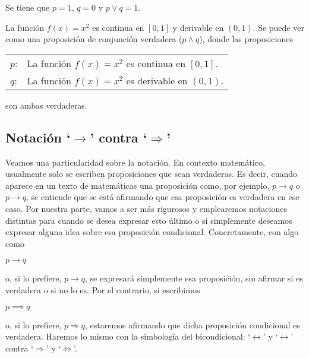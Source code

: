 \noindent Se tiene que $p = 1$, $q = 0$ y $p \lor q = 1$.

La función $f(x) = x^2$ es continua en $[0,1]$ y derivable en $(0,1)$. Se
puede ver como una proposición de conjunción verdadera ($p \land q$), donde
las proposiciones

\begin{center}
\begin{tabular}{ll}
  $p$: & La función $f(x) = x^2$ es continua en $[0,1]$. \\
  $q$: & La función $f(x) = x^2$ es derivable en $(0,1)$.
\end{tabular}
\end{center}

\noindent son ambas verdaderas.






\subsection{Notación `$\rightarrow$' contra `$\Rightarrow$'}%
\label{subsec:notacion-flecha}

Veamos una particularidad sobre la notación. En contexto matemático,
usualmente solo se escriben proposiciones que sean verdaderas. Es decir,
cuando aparece en un texto de matemáticas una proposición como, por ejemplo,
$p \rightarrow q$ o $p \longrightarrow q$, se entiende que se está afirmando
que esa proposición es verdadera en ese caso. Por nuestra parte, vamos a ser
más rigurosos y emplearemos notaciones distintas para cuando se desea
expresar esto último o si simplemente deseamos expresar alguna idea sobre
esa proposición condicional. Concretamente, con algo como

\begin{center}
  $p \to q$
\end{center}

\noindent o, si lo prefiere, $p \longrightarrow q$, se expresará simplemente
 esa proposición, sin afirmar si es verdadera o si no lo es. Por el
 contrario, si escribimos

\begin{center}
  $p \implies q$
\end{center}

\noindent o, si lo prefiere, $p \Rightarrow q$, estaremos afirmando que
dicha proposición condicional es verdadera. Haremos lo mismo con la
simbología del bicondicional: `$\leftrightarrow$' y `$\longleftrightarrow$'
contra `$\Rightarrow$' y `$\Longleftrightarrow$'.

